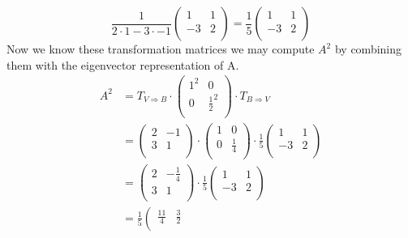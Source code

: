 \documentclass[a4paper]{article}
\begin{document}
\begin{enumerate}
\[  \frac{1}{2 \cdot 1 - 3 \cdot - 1}
  \left(
  \begin{array}{cc}
  1 & 1 \\
  -3 & 2 \\
  \end{array}
  \right)
  =
  \frac{1}{5}
  \left(
  \begin{array}{cc}
  1 & 1 \\
  -3 & 2 \\
  \end{array}
  \right)
  \]
  Now we know these transformation matrices we may compute $A^2$ by combining them with the eigenvector representation of A.
  \begin{align*}
    A^2 &= T_{V \Rightarrow B} \cdot
    \left(
    \begin{array}{cc}
    1^2 & 0 \\
    0 & \frac{1}{2}^2 \\
    \end{array}
    \right)
    \cdot T_{B \Rightarrow V} \\
    &=
    \left(
    \begin{array}{cc}
    2 & -1 \\
    3 & 1 \\
    \end{array}
    \right) \cdot
    \left(
    \begin{array}{cc}
    1 & 0 \\
    0 & \frac{1}{4} \\
    \end{array}
    \right) \cdot
    \frac{1}{5}
    \left(
    \begin{array}{cc}
    1 & 1 \\
    -3 & 2 \\
    \end{array}
    \right) \\
    &=
    \left(
    \begin{array}{cc}
    2 & -\frac{1}{4} \\
    3 & 1 \\
    \end{array}
    \right) \cdot
    \frac{1}{5}
    \left(
    \begin{array}{cc}
    1 & 1 \\
    -3 & 2 \\
    \end{array}
    \right) \\
    &=
    \frac{1}{5}
    \left(
    \begin{array}{cc}
    \frac{11}{4} & \frac{3}{2} \\

\end{array}
\end{align*}
\end{enumerate}
\end{document}
